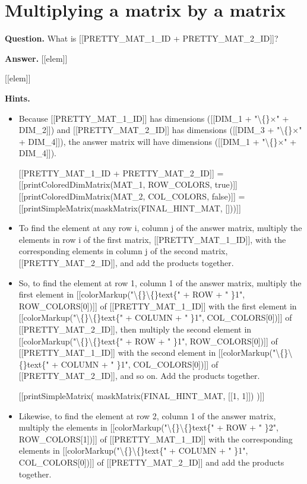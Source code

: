 \documentclass{article}
\begin{document}
\section*{Multiplying a matrix by a matrix}
\textbf{Question.} What is [[PRETTY\_MAT\_1\_ID + PRETTY\_MAT\_2\_ID]]?

\textbf{Answer.} [[elem]]
                
                
                    [[elem]]

\textbf{Hints.}
\begin{itemize}
  \item Because [[PRETTY\_MAT\_1\_ID]] has dimensions ([[DIM\_1 + "\textbackslash\{\}$\times$" + DIM\_2]]) and [[PRETTY\_MAT\_2\_ID]] has dimensions ([[DIM\_3 + "\textbackslash\{\}$\times$" + DIM\_4]]), the answer matrix will have dimensions ([[DIM\_1 + "\textbackslash\{\}$\times$" + DIM\_4]]).
            
            
                
                    [[PRETTY\_MAT\_1\_ID + PRETTY\_MAT\_2\_ID]]
                    =
                    [[printColoredDimMatrix(MAT\_1, ROW\_COLORS, true)]]
                    [[printColoredDimMatrix(MAT\_2, COL\_COLORS, false)]]
                    =
                    [[printSimpleMatrix(maskMatrix(FINAL\_HINT\_MAT, []))]]
  \item To find the element at any row i, column j of the answer matrix, multiply the elements in row i of the first matrix, [[PRETTY\_MAT\_1\_ID]], with the corresponding elements in column j of the second matrix, [[PRETTY\_MAT\_2\_ID]], and add the products together.
  \item So, to find the element at row 1, column 1 of the answer matrix, multiply the first element in [[colorMarkup("\textbackslash\{\}\textbackslash\{\}text\{" + ROW + " \}1", ROW\_COLORS[0])]] of [[PRETTY\_MAT\_1\_ID]] with the first element in [[colorMarkup("\textbackslash\{\}\textbackslash\{\}text\{" + COLUMN + " \}1", COL\_COLORS[0])]] of [[PRETTY\_MAT\_2\_ID]], then multiply the second element in [[colorMarkup("\textbackslash\{\}\textbackslash\{\}text\{" + ROW + " \}1", ROW\_COLORS[0])]] of [[PRETTY\_MAT\_1\_ID]] with the second element in [[colorMarkup("\textbackslash\{\}\textbackslash\{\}text\{" + COLUMN + " \}1", COL\_COLORS[0])]] of [[PRETTY\_MAT\_2\_ID]], and so on. Add the products together.
            
            
                
                    [[printSimpleMatrix(
                            maskMatrix(FINAL\_HINT\_MAT, [[1, 1]])
                        )]]
  \item Likewise, to find the element at row 2, column 1 of the answer matrix, multiply the elements in [[colorMarkup("\textbackslash\{\}\textbackslash\{\}text\{" + ROW + " \}2", ROW\_COLORS[1])]] of [[PRETTY\_MAT\_1\_ID]] with the corresponding elements in [[colorMarkup("\textbackslash\{\}\textbackslash\{\}text\{" + COLUMN + " \}1", COL\_COLORS[0])]] of [[PRETTY\_MAT\_2\_ID]] and add the products together.
            

\end{itemize}
\end{document}
